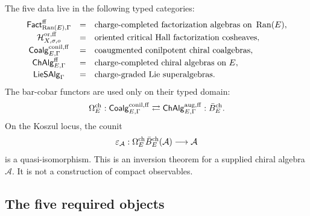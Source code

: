 The five data live in the following typed categories:
$$
\begin{array}{ccl}
\mathsf{Fact}^{\mathrm{ff}}_{\operatorname{Ran}(E),\Gamma}
&=&
\hbox{charge-completed factorization algebras on }\operatorname{Ran}(E),\\[2pt]
\mathcal H^{\mathrm{or,ff}}_{X,\sigma,o}
&=&
\hbox{oriented critical Hall factorization cosheaves},\\[2pt]
\mathsf{Coalg}^{\mathrm{conil,ff}}_{E,\Gamma}
&=&
\hbox{coaugmented conilpotent chiral coalgebras},\\[2pt]
\mathsf{ChAlg}^{\mathrm{ff}}_{E,\Gamma}
&=&
\hbox{charge-completed chiral algebras on }E,\\[2pt]
\mathsf{LieSAlg}_{\Gamma}
&=&
\hbox{charge-graded Lie superalgebras}.
\end{array}
$$
The bar-cobar functors are used only on their typed domain:
$$
\Omega^{\mathrm{ch}}_E:
\mathsf{Coalg}^{\mathrm{conil,ff}}_{E,\Gamma}
\rightleftarrows
\mathsf{ChAlg}^{\mathrm{aug,ff}}_{E,\Gamma}:\bar B_E^{\mathrm{ch}}.
$$
On the Koszul locus, the counit
$$
\varepsilon_{\mathcal A}:
\Omega^{\mathrm{ch}}_E\bar B_E^{\mathrm{ch}}(\mathcal A)
\longrightarrow
\mathcal A
$$
is a quasi-isomorphism.  This is an inversion theorem for a supplied
chiral algebra \(\mathcal A\).  It is not a construction of compact
observables.

\subsection{The five required objects}
\label{subsec:cell-eleven-five-objects}

